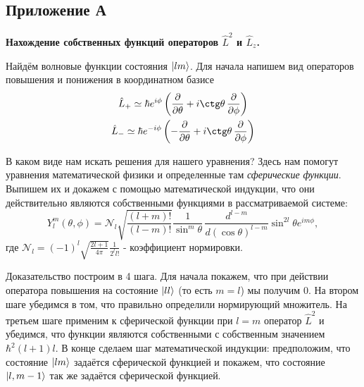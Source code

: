 \setcounter{figure}{0}  
\begin{center}
    \section{Приложение А}\label{appendix:A}
    \textbf{\Large{Нахождение собственных функций операторов $\hat{L}^2$ и $\hat{L}_z$}.}
\end{center}

Найдём волновые функции состояния $\ket{lm}$. Для начала напишем вид операторов повышения и понижения в координатном базисе
\begin{gather*}
\hat{L}_+ \simeq \hbar e^{i\phi}\left(\frac{\partial}{\partial \theta} + i \ctg\theta\,\frac{\partial}{\partial \phi} \right)\\
\hat{L}_- \simeq \hbar e^{-i\phi}\left(-\frac{\partial}{\partial \theta} + i \ctg\theta\,\frac{\partial}{\partial \phi} \right)
\end{gather*}

В каком виде нам искать решения для нашего уравнения? Здесь нам помогут уравнения математической физики и определенные там \textit{сферические функции}. Выпишем их и докажем с помощью математической индукции, что они действительно являются собственными функциями в рассматриваемой системе:
\[
Y^m_l(\theta, \phi) = \mathcal{N}_l\sqrt{\frac{(l+m)!}{(l-m)!}} \frac{1}{\sin^{m}\theta}\,\frac{d^{l-m}}{d(\cos\theta)^{l-m}}\sin^{2l}\theta e^{im\phi},
\]
где $\mathcal{N}_l = (-1)^l \sqrt{\frac{2l+1}{4\pi}}\frac{1}{2^l l!}$ - коэффициент нормировки.

Доказательство построим в 4 шага. Для начала покажем, что при действии оператора повышения на состояние $\ket{ll}$ (то есть $m = l$) мы получим 0. На втором шаге убедимся в том, что правильно определили нормирующий множитель. На третьем шаге применим к сферической функции при $l=m$ оператор $\hat{L}^2$ и убедимся, что функции являются собственными с собственным значением $\hbar^2(l+1)l$. В конце сделаем шаг математической индукции: предположим, что состояние $\ket{lm}$ задаётся сферической функцией и покажем, что состояние $\ket{l, m-1}$ так же задаётся сферической функцией.

